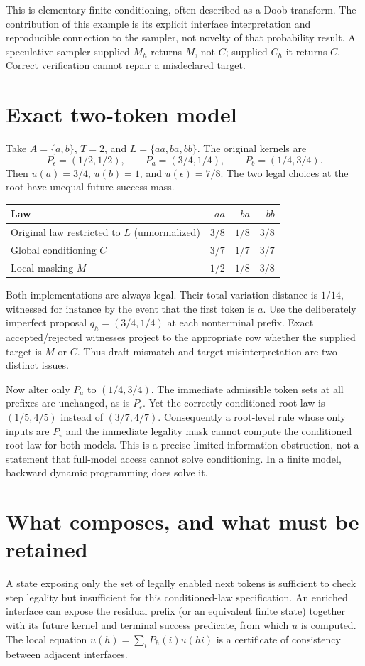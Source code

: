 \documentclass[11pt]{article}
\begin{document}
This is elementary finite conditioning, often described as a Doob transform.
The contribution of this example is its explicit interface interpretation and
reproducible connection to the sampler, not novelty of that probability result.
A speculative sampler supplied $M_h$ returns $M$, not $C$; supplied $C_h$ it
returns $C$. Correct verification cannot repair a misdeclared target.

\section{Exact two-token model}
Take $A=\{a,b\}$, $T=2$, and $L=\{aa,ba,bb\}$. The original kernels are
\[
 P_\epsilon=(1/2,1/2),\qquad P_a=(3/4,1/4),\qquad P_b=(1/4,3/4).
\]
Then $u(a)=3/4$, $u(b)=1$, and $u(\epsilon)=7/8$.
The two legal choices at the root have unequal future success mass.
\begin{center}
\begin{tabular}{lrrr}\toprule
Law & $aa$ & $ba$ & $bb$\\\midrule
Original law restricted to $L$ (unnormalized)&$3/8$&$1/8$&$3/8$\\
Global conditioning $C$&$3/7$&$1/7$&$3/7$\\
Local masking $M$&$1/2$&$1/8$&$3/8$\\\bottomrule
\end{tabular}
\end{center}
Both implementations are always legal. Their total variation distance is
$1/14$, witnessed for instance by the event that the first token is $a$.
Use the deliberately imperfect proposal $q_h=(3/4,1/4)$ at each nonterminal
prefix. Exact accepted/rejected witnesses project to the appropriate row
whether the supplied target is $M$ or $C$. Thus draft mismatch and target
misinterpretation are two distinct issues.

Now alter only $P_a$ to $(1/4,3/4)$. The immediate admissible token sets at all
prefixes are unchanged, as is $P_\epsilon$. Yet the correctly conditioned root
law is $(1/5,4/5)$ instead of $(3/7,4/7)$. Consequently a root-level rule whose
only inputs are $P_\epsilon$ and the immediate legality mask cannot compute the
conditioned root law for both models. This is a precise limited-information
obstruction, not a statement that full-model access cannot solve conditioning.
In a finite model, backward dynamic programming does solve it.

\section{What composes, and what must be retained}
A state exposing only the set of legally enabled next tokens is sufficient to
check step legality but insufficient for this conditioned-law specification.
An enriched interface can expose the residual prefix (or an equivalent finite
state) together with its future kernel and terminal success predicate, from
which $u$ is computed. The local equation $u(h)=\sum_iP_h(i)u(hi)$ is a
certificate of consistency between adjacent interfaces.
\end{document}
